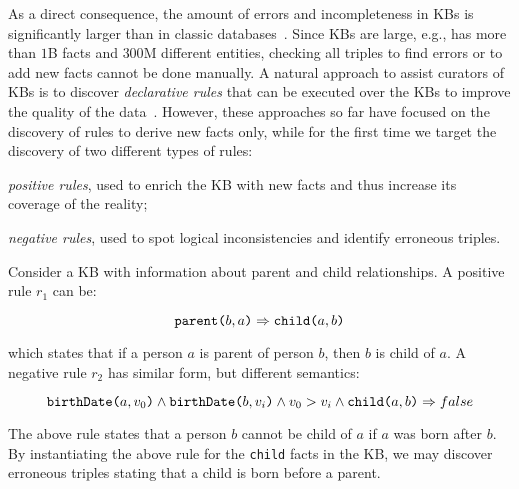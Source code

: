 As a direct consequence, the amount of errors and incompleteness in KBs is significantly larger than in classic databases~\cite{suchanek2009sofie}.
Since KBs are large, e.g., \wikidata has more than $1$B facts and $300$M different entities, %
checking all triples to find errors or to add new facts cannot be done manually. %
A natural approach to assist curators of KBs is to discover %
\emph{declarative rules} that can be executed over the KBs to improve the quality of the data~\cite{Chen:2016,abedjan2014amending,galarraga2015fast}. However, these approaches so far have focused on the discovery of rules to derive new facts only, while for the first time
we target the discovery %
of two different types of rules:
\begin{inparaenum}[\itshape(i)]
	\item {\em positive rules}, used to enrich the KB with new facts and thus increase its coverage of the reality;
	\item {\em negative rules}, used to spot logical inconsistencies and identify erroneous triples.
\end{inparaenum}

\begin{example}\label{ex:krd_intro}
	Consider a KB with information about parent and child relationships.
	A positive rule $r_1$ can be:
	
	\vspace{-1ex}
	{\small
		\begin{equation*}
			\texttt{parent(}b,a\texttt{)} \Rightarrow \texttt{child(}a,b\texttt{)}
		\end{equation*}
	} 
	\vspace{-2ex}
	
	\noindent
	which states that if a person $a$ is parent of person $b$, then $b$ is child of $a$. 
	A negative rule $r_2$ has similar form, but different semantics:
	
	\vspace{-2.5ex}
	{\small
		\begin{equation*}
			\texttt{birthDate(}a,v_0\texttt{)} \wedge \texttt{birthDate(}b,v_i\texttt{)} \wedge v_0 > v_i \wedge  \texttt{child(}a,b\texttt{)}  \Rightarrow false
		\end{equation*}
	} 
	\vspace{-2ex}
	
	\noindent The above rule states that a person $b$ cannot be child of $a$ if $a$ was born after $b$. By instantiating the above rule for the \texttt{child} facts in the KB, we may discover erroneous triples stating that a child is born before a parent.
\end{example}

